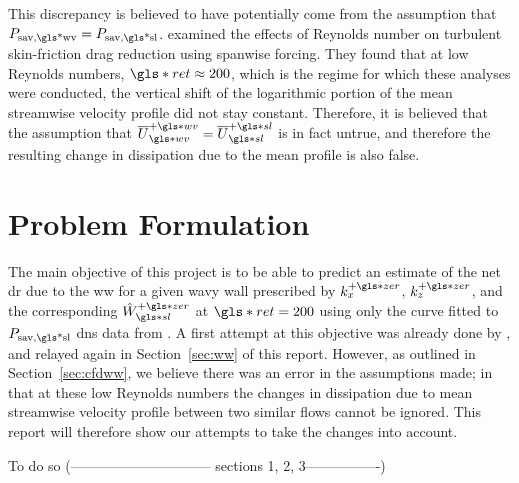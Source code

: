This discrepancy is believed to have potentially come from the assumption that $P_\text{sav,\gls*{wv}}= P _\text{sav,\gls*{sl}} $. \textcite{gatti2016} examined the effects of Reynolds number on turbulent skin-friction drag reduction using spanwise forcing. They found that at low Reynolds numbers, $\gls*{ret}\approx200$, which is the regime for which these analyses were conducted, the vertical shift of the logarithmic portion of the mean streamwise velocity profile did not stay constant. Therefore, it is believed that the assumption that $\overline{U}\pw\ww=\overline{U}\ps\ssl$ is in fact untrue, and therefore the resulting change in dissipation due to the mean profile is also false.

\section{Problem Formulation}\label{sec:objective} 
The main objective of this project is to be able to predict an estimate of the net \gls{dr} due to the \gls{ww} for a given wavy wall prescribed by $k_x\pz$, $k_z\pz$, and the corresponding $\hat{W}\pz\ssl$ at $ \gls*{ret}=200$ using only the curve fitted to $P_\text{sav,\gls*{sl}} $ \gls{dns} data from \vqt. A first attempt at this objective was already done by \sct, and relayed again in Section~\ref{sec:ww} of this report. However, as outlined in Section~\ref{sec:cfdww}, we believe there was an error in the assumptions made; in that at these low Reynolds numbers the changes in dissipation due to mean streamwise velocity profile between two similar flows cannot be ignored. This report will therefore show our attempts to take the changes into account.

To do so (------------------------------ sections 1, 2, 3----------------)



